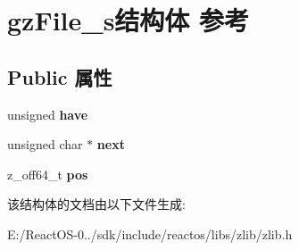 \hypertarget{structgz_file__s}{}\section{gz\+File\+\_\+s结构体 参考}
\label{structgz_file__s}
\subsection*{Public 属性}
\begin{DoxyCompactItemize}
\item 
\mbox{\label{structgz_file__s_abb96e208e17a991c09b4df6cefcc1c04}} 
unsigned {\bfseries have}
\item 
\mbox{\label{structgz_file__s_a8c1f4682372cc228f4e37bf7f95870a8}} 
unsigned char $\ast$ {\bfseries next}
\item 
\mbox{\label{structgz_file__s_a98038b7edb4ab55ee321fa388afb687e}} 
z\+\_\+off64\+\_\+t {\bfseries pos}
\end{DoxyCompactItemize}


该结构体的文档由以下文件生成\+:\begin{DoxyCompactItemize}
\item 
E\+:/\+React\+O\+S-\/0../sdk/include/reactos/libs/zlib/zlib.\+h\end{DoxyCompactItemize}
